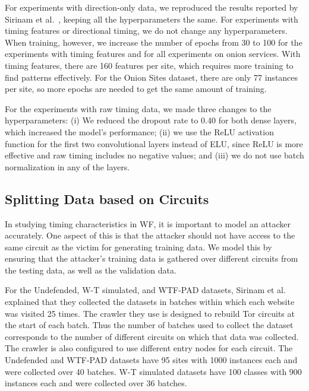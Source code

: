 \documentclass[USenglish,oneside,twocolumn]{article}
\begin{document}
For experiments with direction-only data, we reproduced the results reported by Sirinam et al.~\cite{Sirinam2018}, keeping all the hyperparameters the same. For experiments with timing features or directional timing, we do not change any hyperparameters. When training, however, we increase the number of epochs from 30 to 100 for the experiments with timing features and for all experiments on onion services. With timing features, there are 160 features per site, which requires more training to find patterns effectively. For the Onion Sites dataset, there are only 77 instances per site, so more epochs are needed to get the same amount of training.






For the experiments with raw timing data, we made three changes to the hyperparameters: (i) We reduced the dropout rate to 0.40 for both dense layers, which increased the model's performance; (ii) we use the ReLU activation function for the first two convolutional layers instead of ELU, since ReLU is more effective and raw timing includes no negative values; and (iii) we do not use batch normalization in any of the layers.





\subsection{Splitting Data based on Circuits}
\label{split_circuits}

In studying timing characteristics in WF, it is important to model an attacker accurately. One aspect of this is that the attacker should not have access to the same circuit as the victim for generating training data. We model this by ensuring that the attacker's training data is gathered over different circuits from the testing data, as well as the validation data.  

For the Undefended, W-T simulated, and WTF-PAD datasets, Sirinam et al. explained that they collected the datasets in batches within which each website was visited 25 times. The crawler they use is designed to rebuild Tor circuits at the start of each batch. Thus the number of batches used to collect the dataset corresponds to the number of different circuits on which that data was collected. The crawler is also configured to use different entry nodes for each circuit. The Undefended and WTF-PAD datasets have 95 sites with 1000 instances each and were collected over 40 batches. W-T simulated datasets have 100 classes with 900 instances each and were collected over 36 batches.
\end{document}
